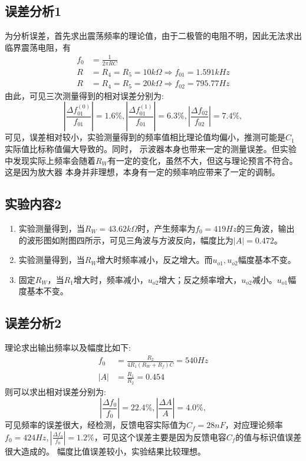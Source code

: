 \documentclass[a4paper,11pt,UTF8]{ctexart}
\begin{document}
\subsection{误差分析1}
  为分析误差，首先求出震荡频率的理论值，由于二极管的电阻不明，因此无法求出临界震荡电阻，有
  \begin{equation}
    \begin{aligned}
      f_0&=\frac{1}{2\pi RC}\\
      R&=R_4=R_5=10k\Omega\Rightarrow f_{01}=1.591kHz\\
      R&=R_4=R_5=20k\Omega\Rightarrow f_{02}=795.77Hz
    \end{aligned}
  \end{equation}
  由此，可见三次测量得到的相对误差分别为:
  \begin{equation}
    \left |\frac{\Delta f_{01}^{(0)}}{f_{01}}\right |=1.6\%,
    \left |\frac{\Delta f_{01}^{(1)}}{f_{01}}\right |=6.3\%,
    \left |\frac{\Delta f_{02}}{f_{02}}\right |=7.4\%,
  \end{equation}
  可见，误差相对较小，实验测量得到的频率值相比理论值均偏小，推测可能是$C_1$实际值比标称值偏大导致的。同时，
  示波器本身也带来一定的测量误差。但实验中发现实际上频率会随着$R_W$有一定的变化，虽然不大，但这与理论预言不符合。这是因为放大器
  本身并非理想，本身有一定的频率响应带来了一定的调制。
\subsection{实验内容2}
\begin{enumerate}
  \item 实验测量得到，当$R_W=43.62k\Omega$时，产生频率为$f_0=419Hz$的三角波，输出的波形图如附图四所示，可见三角波与方波反向，幅度比为$|A|=0.472$。
  \item 实验测量得到，当$R_W$增大时频率减小，反之增大。而$u_{o1},u_{o2}$幅度基本不变。
  \item 固定$R_W$，当$R_1$增大时，频率减小，$u_{o2}$增大；反之频率增大，$u_{o2}$减小。$u_{o1}$幅度基本不变。
\end{enumerate}
\subsection{误差分析2}
  理论求出输出频率以及幅度比如下:
  \begin{equation}
    \begin{aligned}
      f_0&=\frac{R_2}{4R_1(R_W+R_f)C}=540Hz\\
      |A|&=\frac{R_1}{R_2}=0.454
    \end{aligned}
  \end{equation}
  则可以求出相对误差分别为:
  \begin{equation}
    \left |\frac{\Delta f_{0}}{f_{0}}\right |=22.4\%,
    \left |\frac{\Delta A}{A}\right |=4.0\%,
  \end{equation}
  可见频率的误差很大，经检测，反馈电容实际值为$C_f=28nF$，对应理论频率$f_0=424Hz,\left |\frac{\Delta f_{0}}{f_{0}}\right |=1.2\%$，可见这个误差主要是因为反馈电容$C_f$的值与标识值误差很大造成的。
  幅度比值误差较小，实验结果比较理想。
\end{document}
